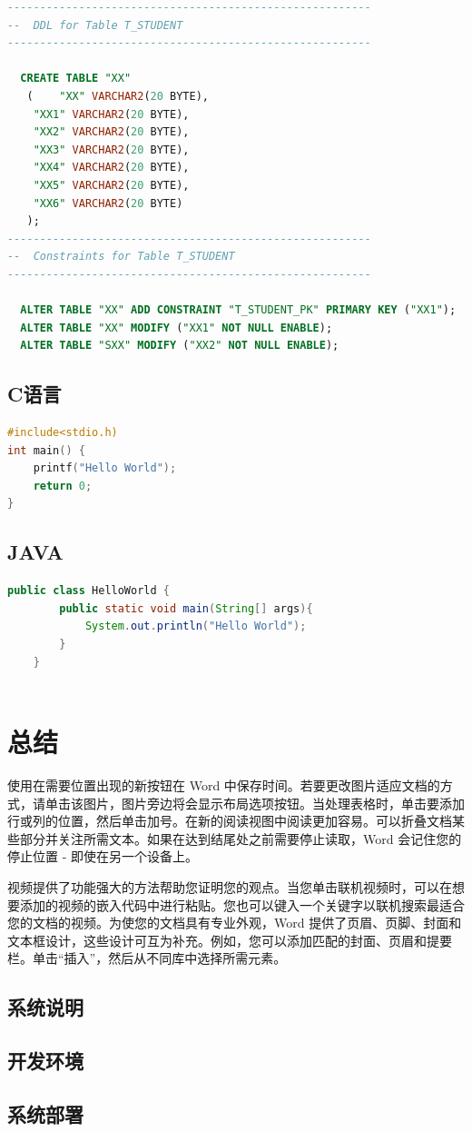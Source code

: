 \documentclass[UTF8]{ctexart}
\numberwithin{figure}{section}
\begin{document}
\begin{lstlisting}[language=SQL,escapeinside=``]
--------------------------------------------------------
--  DDL for Table T_STUDENT
--------------------------------------------------------

  CREATE TABLE "XX" 
   (	"XX" VARCHAR2(20 BYTE), 
	"XX1" VARCHAR2(20 BYTE), 
	"XX2" VARCHAR2(20 BYTE), 
	"XX3" VARCHAR2(20 BYTE), 
	"XX4" VARCHAR2(20 BYTE), 
	"XX5" VARCHAR2(20 BYTE), 
	"XX6" VARCHAR2(20 BYTE)
   );
--------------------------------------------------------
--  Constraints for Table T_STUDENT
--------------------------------------------------------

  ALTER TABLE "XX" ADD CONSTRAINT "T_STUDENT_PK" PRIMARY KEY ("XX1");
  ALTER TABLE "XX" MODIFY ("XX1" NOT NULL ENABLE);
  ALTER TABLE "SXX" MODIFY ("XX2" NOT NULL ENABLE);

\end{lstlisting}


\subsection{C语言}
\begin{lstlisting}[language=C,escapeinside=``]
#include<stdio.h)
int main() {
	printf("Hello World");
	return 0;
}
\end{lstlisting}
\subsection{JAVA}
\begin{lstlisting}[language=JAVA,escapeinside=``]
	public class HelloWorld {
		public static void main(String[] args){
			System.out.println("Hello World");
		}
	}
	
\end{lstlisting}



\newpage
\section{总结}
使用在需要位置出现的新按钮在 Word 中保存时间。若要更改图片适应文档的方式，请单击该图片，图片旁边将会显示布局选项按钮。当处理表格时，单击要添加行或列的位置，然后单击加号。在新的阅读视图中阅读更加容易。可以折叠文档某些部分并关注所需文本。如果在达到结尾处之前需要停止读取，Word 会记住您的停止位置 - 即使在另一个设备上。
\par 视频提供了功能强大的方法帮助您证明您的观点。当您单击联机视频时，可以在想要添加的视频的嵌入代码中进行粘贴。您也可以键入一个关键字以联机搜索最适合您的文档的视频。为使您的文档具有专业外观，Word 提供了页眉、页脚、封面和文本框设计，这些设计可互为补充。例如，您可以添加匹配的封面、页眉和提要栏。单击“插入”，然后从不同库中选择所需元素。

\newpage
\begin{appendices}
	\section{系统说明}

	\subsection{开发环境}

	\subsection{系统部署}

\end{appendices}
\end{document}
